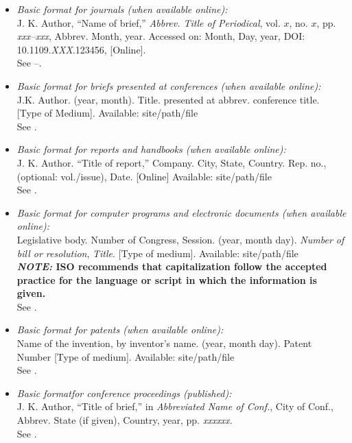 \documentclass{IEEEtran}
\begin{document}
\begin{itemize}
\item \emph{Basic format for journals (when available online):}\\
J. K. Author, ``Name of brief,'' \emph{Abbrev. Title of Periodical}, vol. $x$, no. $x$, pp. \emph{xxx--xxx}, Abbrev. Month, year. Accessed on: Month, Day, year, DOI: 10.1109.\emph{XXX}.123456, [Online].\\
See \cite{b14}--\cite{b16}.

\item \emph{Basic format for briefs presented at conferences (when available online): }\\
J.K. Author. (year, month). Title. presented at abbrev. conference title. [Type of Medium]. Available: site/path/file\\
See \cite{b17}.

\item \emph{Basic format for reports and handbooks (when available online):}\\
J. K. Author. ``Title of report,'' Company. City, State, Country. Rep. no., (optional: vol./issue), Date. [Online] Available: site/path/file\\
See \cite{b18,b19}.

\item \emph{Basic format for computer programs and electronic documents (when available online): }\\
Legislative body. Number of Congress, Session. (year, month day). \emph{Number of bill or resolution}, \emph{Title}. [Type of medium]. Available: site/path/file\\
\textbf{\emph{NOTE: }ISO recommends that capitalization follow the accepted practice for the language or script in which the information is given.}\\
See \cite{b20}.

\item \emph{Basic format for patents (when available online):}\\
Name of the invention, by inventor's name. (year, month day). Patent Number [Type of medium]. Available: site/path/file\\
See \cite{b21}.

\item \emph{Basic format}\emph{for conference proceedings (published):}\\
J. K. Author, ``Title of brief,'' in \emph{Abbreviated Name of Conf.}, City of Conf., Abbrev. State (if given), Country, year, pp. \emph{xxxxxx.}\\
See \cite{b22}.


\end{itemize}
\end{document}
